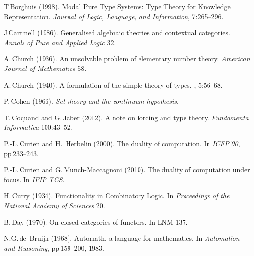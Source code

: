 \documentclass[11pt,twocolumn]{article}
\begin{document}
{\begin{thebibliography}{000}
T\,Borghuis (1998).
\newblock Modal Pure Type Systems: Type Theory for Knowledge
Representation.  
\newblock \emph{Journal of Logic, Language, and Information}, 7:265--296. 

J\,Cartmell (1986).
\newblock Generalised algebraic theories and contextual categories.
\newblock \emph{Annals of Pure and Applied Logic} 32. %


A.\,Church (1936).
\newblock An unsolvable problem of elementary number theory.
\newblock \emph{American Journal of Mathematics} 58.

A.\,Church (1940).
\newblock A formulation of the simple theory of types.
, 5:56--68. 
  
P.\,Cohen (1966).
\newblock \emph{Set theory and the continuum hypothesis}.

T.\,Coquand and G.\,Jaber (2012).
\newblock A note on forcing and type theory.
\newblock \emph{Fundamenta Informatica} 100:43--52.


P.-L.\,Curien and H.\, Herbelin (2000).
\newblock The duality of computation.
\newblock In \emph{ICFP'00}, pp\,233--243.

P.-L.\,Curien and G.\,Munch-Maccagnoni (2010).
\newblock The duality of computation under focus.
\newblock In \emph{IFIP TCS}.

H.\,Curry (1934).
\newblock Functionality in Combinatory Logic.
\newblock In \emph{Proceedings of the National Academy of Sciences} 20.

B.\,Day (1970).
\newblock On closed categories of functors.
\newblock In LNM 137. 

N.G.\,de~Bruijn (1968).
\newblock Automath, a language for mathematics.
\newblock In \emph{Automation and Reasoning}, pp\,159--200, 1983.


\end{thebibliography}}
\end{document}
